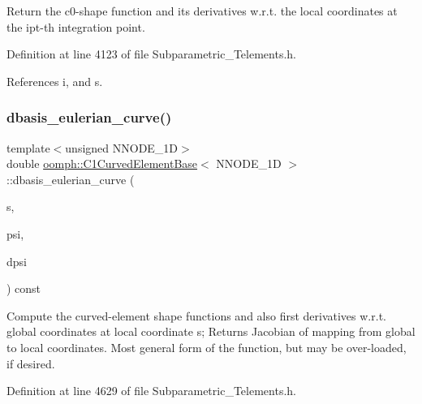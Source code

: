 Return the c0-\/shape function and its derivatives w.\+r.\+t. the local coordinates at the ipt-\/th integration point. 



Definition at line 4123 of file Subparametric\+\_\+\+Telements.\+h.



References i, and s.

\mbox{\label{classoomph_1_1C1CurvedElementBase_aa13f07f1ec64a996149ab7c9e10378a0}} 
\subsubsection{\texorpdfstring{dbasis\+\_\+eulerian\+\_\+curve()}{dbasis\_eulerian\_curve()}}
{\footnotesize\ttfamily template$<$unsigned N\+N\+O\+D\+E\+\_\+1D$>$ \\
double \hyperlink{classoomph_1_1C1CurvedElementBase}{oomph\+::\+C1\+Curved\+Element\+Base}$<$ N\+N\+O\+D\+E\+\_\+1D $>$\+::dbasis\+\_\+eulerian\+\_\+curve (\begin{DoxyParamCaption}\item[{const \hyperlink{classoomph_1_1Vector}{Vector}$<$ double $>$ \&}]{s,  }\item[{\hyperlink{classoomph_1_1Shape}{Shape} \&}]{psi,  }\item[{\hyperlink{classoomph_1_1DShape}{D\+Shape} \&}]{dpsi }\end{DoxyParamCaption}) const\hspace{0.3cm}{\ttfamily [inline]}}



Compute the curved-\/element shape functions and also first derivatives w.\+r.\+t. global coordinates at local coordinate s; Returns Jacobian of mapping from global to local coordinates. Most general form of the function, but may be over-\/loaded, if desired. 



Definition at line 4629 of file Subparametric\+\_\+\+Telements.\+h.

\mbox{\label{classoomph_1_1C1CurvedElementBase_a834ee576efd64a3b9f70f6b0be1f26b9}} 
